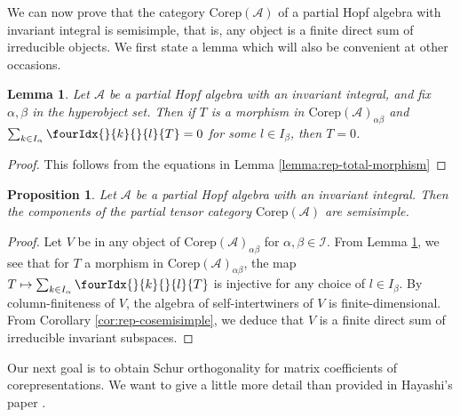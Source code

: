 \documentclass[10pt]{article}
\DeclareMathOperator{\rcf}{\mathrm{rcfd}}
\newcommand{\Corep}{\mathrm{Corep}}
\newcommand{\Gr}[5]{\fourIdx{#2}{#4}{#3}{#5}{#1}}%
\newcommand{\Gru}[3]{\Gr{#1}{}{}{#2}{#3}}
\newtheorem{Lem}[Theorem]{Lemma}
\newtheorem{Prop}[Theorem]{Proposition}
\theoremstyle{definition}
\numberwithin{equation}{section}
\begin{document}
We can now prove that the category $\Corep(\mathscr{A})$ of a partial Hopf algebra with invariant integral is semisimple, that is, any object is a finite direct sum of irreducible objects. We first state a lemma which will also be convenient at other occasions.

\begin{Lem}\label{LemInjMor}  Let $\mathscr{A}$ be a partial Hopf algebra with an invariant integral, and fix $\alpha,\beta$ in the hyperobject set.  Then if $T$ is a morphism in $\Corep(\mathscr{A})_{\alpha\beta}$ and $\sum_{k\in I_\alpha} \Gru{T}{k}{l}=0$ for some $l \in I_\beta$, then $T=0$.
\end{Lem} 

\begin{proof} This follows from the equations in Lemma \ref{lemma:rep-total-morphism}
\end{proof}

\begin{Prop}\label{prop:rep-cosemisimple} Let $\mathscr{A}$ be a partial Hopf algebra with an invariant integral.   Then the components of the partial tensor category $\Corep(\mathscr{A})$ are semisimple.
\end{Prop}
\begin{proof} 

Let $V$ be in any object of $\Corep(\mathscr{A})_{\alpha\beta}$ for $\alpha,\beta\in \mathscr{I}$.  From Lemma \ref{LemInjMor}, we see that for $T$ a morphism in $\Corep(\mathscr{A})_{\alpha\beta}$, the map $T\mapsto \sum_{k\in I_\alpha} \Gru{T}{k}{l}$ is injective for any choice of $l\in I_\beta$. By column-finiteness of $V$, the algebra of self-intertwiners of $V$ is finite-dimensional. From Corollary \ref{cor:rep-cosemisimple}, we deduce that $V$ is a finite direct sum of irreducible invariant subspaces.
\end{proof} 


Our next goal is to obtain Schur orthogonality for matrix coefficients of corepresentations. We want to give a little more detail than provided in Hayashi's paper \cite{Hay1}.
\end{document}
